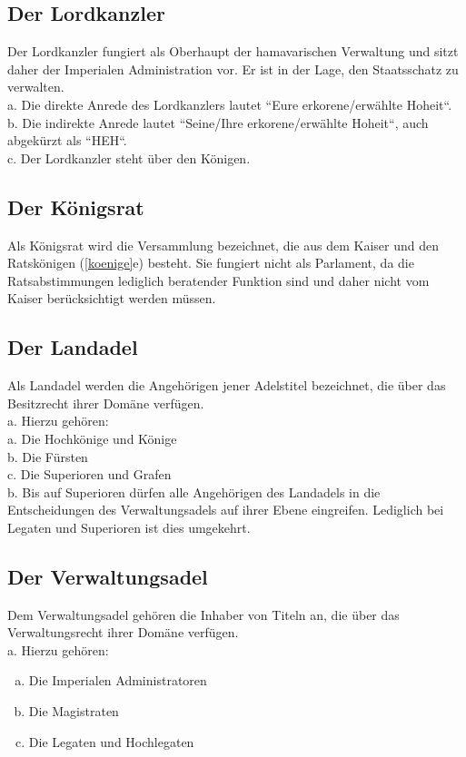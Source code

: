 \documentclass{article}
\begin{document}
\subsection{Der Lordkanzler}
Der Lordkanzler fungiert als Oberhaupt der hamavarischen Verwaltung und sitzt daher der Imperialen Administration vor. Er ist in der Lage, den Staatsschatz zu verwalten. \\
a. Die direkte Anrede des Lordkanzlers lautet ``Eure erkorene/erwählte Hoheit``.\\
b. Die indirekte Anrede lautet ``Seine/Ihre erkorene/erwählte Hoheit``, auch abgekürzt als ``HEH``.\\
c. Der Lordkanzler steht über den Königen.

\subsection{Der Königsrat}
Als Königsrat wird die Versammlung bezeichnet, die aus dem Kaiser und den Ratskönigen (\ref{koenige}e) besteht. Sie fungiert nicht als Parlament, da die Ratsabstimmungen lediglich beratender Funktion sind und daher nicht vom Kaiser berücksichtigt werden müssen.  

\subsection{Der Landadel}
Als Landadel werden die Angehörigen jener Adelstitel bezeichnet, die über das Besitzrecht ihrer Domäne verfügen.\\
a. Hierzu gehören: \\
a. Die Hochkönige und Könige  \\
b. Die Fürsten  \\
c. Die Superioren und Grafen  \\
b. Bis auf Superioren dürfen alle Angehörigen des Landadels in die Entscheidungen des Verwaltungsadels auf ihrer Ebene eingreifen. Lediglich bei Legaten und Superioren ist dies umgekehrt.

\subsection{Der Verwaltungsadel}
Dem Verwaltungsadel gehören die Inhaber von Titeln an, die über das Verwaltungsrecht ihrer Domäne verfügen.  \\
a. Hierzu gehören:
\begin{enumerate}[a)]
	\item Die Imperialen Administratoren
	\item Die Magistraten
	\item Die Legaten und Hochlegaten
\end{enumerate}
\end{document}
